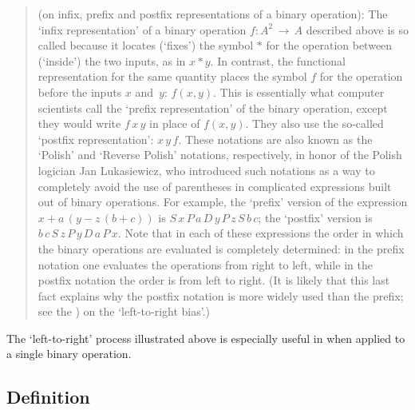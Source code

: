 {%
\begin{quotation}
{\footnotesize \underline{\Note} (on infix, prefix and postfix representations of a binary operation): The `infix representation' of a binary operation $f:A^{2} \,{\rightarrow}\, A$ described above is so called
    because it locates (`fixes') the symbol ${\ast}$ for the operation between (`inside') the two inputs, as in $x{\ast}y$.
    In contrast, the functional representation for the same quantity places the symbol $f$ for the operation before the inputs $x$ and~$y$: $f(x,y)$.
    This is essentially what computer scientists call the `prefix representation' of the binary operation,
    except they would write $f\,x\,y$ in place of $f(x,y)$. They also use the so-called `postfix representation': $x\,y\,f$.
    These notations are also known as the `Polish' and `Reverse Polish' notations, respectively, in honor of the Polish logician Jan Lukasiewicz,
    who introduced such notations as a way to completely avoid the use of parentheses in complicated expressions built out of binary operations.
    For example, the `prefix' version of the expression $x + a\,(y - z\,(b+c))$ is $S\,x\,P\,a\,D\,y\,P\,z\,S\,b\,c$;
    the `postfix' version is $b\,c\,S\,z\,P\,y\,D\,a\,P\,x$.
    Note that in each of these expressions the order in which the binary operations are evaluated is completely determined:
    in the prefix notation one evaluates the operations from right to left, while in the postfix notation the order is from left to right.
    (It is likely that this last fact explains why the postfix notation is more widely used than the prefix; see the {\Note}) on the `left-to-right bias'.)
}%
\end{quotation}

\VV


    The `left-to-right' process illustrated above is especially useful in {\TheseNotes} when applied to a single binary operation.

            \subsection{\small{\bf Definition}}
            \label{DefA60.30}

\V

}
